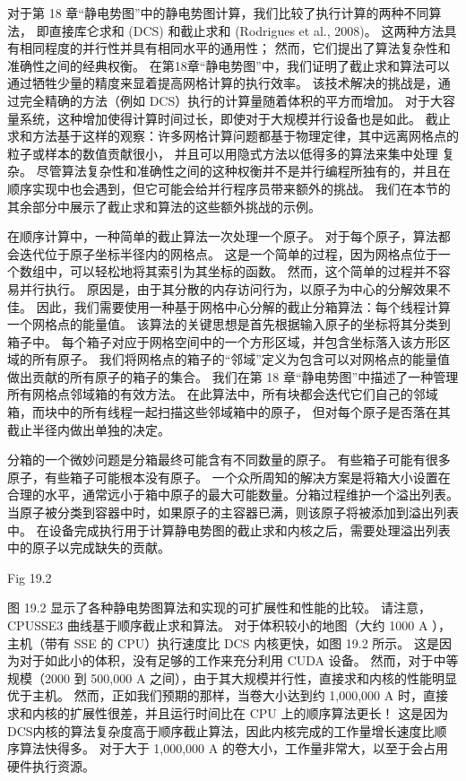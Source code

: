 对于第 18 章“静电势图”中的静电势图计算，我们比较了执行计算的两种不同算法，
即直接库仑求和 (DCS) 和截止求和 (Rodrigues et al., 2008)。 
这两种方法具有相同程度的并行性并具有相同水平的通用性； 然而，它们提出了算法复杂性和准确性之间的经典权衡。 
在第18章“静电势图”中，我们证明了截止求和算法可以通过牺牲少量的精度来显着提高网格计算的执行效率。 
该技术解决的挑战是，通过完全精确的方法（例如 DCS）执行的计算量随着体积的平方而增加。 
对于大容量系统，这种增加使得计算时间过长，即使对于大规模并行设备也是如此。 
截止求和方法基于这样的观察：许多网格计算问题都基于物理定律，其中远离网格点的粒子或样本的数值贡献很小，
并且可以用隐式方法以低得多的算法来集中处理 复杂。 
尽管算法复杂性和准确性之间的这种权衡并不是并行编程所独有的，并且在顺序实现中也会遇到，但它可能会给并行程序员带来额外的挑战。 
我们在本节的其余部分中展示了截止求和算法的这些额外挑战的示例。

在顺序计算中，一种简单的截止算法一次处理一个原子。 对于每个原子，算法都会迭代位于原子坐标半径内的网格点。 
这是一个简单的过程，因为网格点位于一个数组中，可以轻松地将其索引为其坐标的函数。 然而，这个简单的过程并不容易并行执行。 
原因是，由于其分散的内存访问行为，以原子为中心的分解效果不佳。 
因此，我们需要使用一种基于网格中心分解的截止分箱算法：每个线程计算一个网格点的能量值。 
该算法的关键思想是首先根据输入原子的坐标将其分类到箱子中。 
每个箱子对应于网格空间中的一个方形区域，并包含坐标落入该方形区域的所有原子。 
我们将网格点的箱子的“邻域”定义为包含可以对网格点的能量值做出贡献的所有原子的箱子的集合。 
我们在第 18 章“静电势图”中描述了一种管理所有网格点邻域箱的有效方法。 
在此算法中，所有块都会迭代它们自己的邻域箱，而块中的所有线程一起扫描这些邻域箱中的原子，
但对每个原子是否落在其截止半径内做出单独的决定。

分箱的一个微妙问题是分箱最终可能含有不同数量的原子。 有些箱子可能有很多原子，有些箱子可能根本没有原子。 
一个众所周知的解决方案是将箱大小设置在合理的水平，通常远小于箱中原子的最大可能数量。分箱过程维护一个溢出列表。 
当原子被分类到容器中时，如果原子的主容器已满，则该原子将被添加到溢出列表中。 
在设备完成执行用于计算静电势图的截止求和内核之后，需要处理溢出列表中的原子以完成缺失的贡献。

{\color{red} Fig 19.2}

图 19.2 显示了各种静电势图算法和实现的可扩展性和性能的比较。 请注意，CPUSSE3 曲线基于顺序截止求和算法。 
对于体积较小的地图（大约 1000 A ），主机（带有 SSE 的 CPU）执行速度比 DCS 内核更快，如图 19.2 所示。 
这是因为对于如此小的体积，没有足够的工作来充分利用 CUDA 设备。 
然而，对于中等规模（2000 到 500,000 A 之间），由于其大规模并行性，直接求和内核的性能明显优于主机。 
然而，正如我们预期的那样，当卷大小达到约 1,000,000 A 时，直接求和内核的扩展性很差，并且运行时间比在 CPU 上的顺序算法更长！ 
这是因为DCS内核的算法复杂度高于顺序截止算法，因此内核完成的工作量增长速度比顺序算法快得多。 
对于大于 1,000,000 A 的卷大小，工作量非常大，以至于会占用硬件执行资源。

